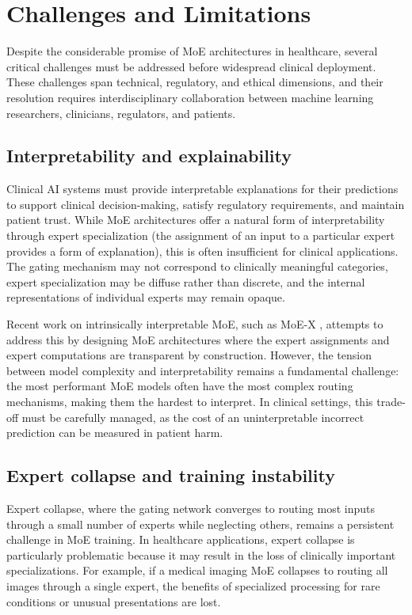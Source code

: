 
\section*{Challenges and Limitations}

Despite the considerable promise of MoE architectures in healthcare, several critical challenges must be addressed before widespread clinical deployment. These challenges span technical, regulatory, and ethical dimensions, and their resolution requires interdisciplinary collaboration between machine learning researchers, clinicians, regulators, and patients.

\subsection*{Interpretability and explainability}

Clinical AI systems must provide interpretable explanations for their predictions to support clinical decision-making, satisfy regulatory requirements, and maintain patient trust. While MoE architectures offer a natural form of interpretability through expert specialization (the assignment of an input to a particular expert provides a form of explanation), this is often insufficient for clinical applications. The gating mechanism may not correspond to clinically meaningful categories, expert specialization may be diffuse rather than discrete, and the internal representations of individual experts may remain opaque.

Recent work on intrinsically interpretable MoE, such as MoE-X \cite{chen2024moe_llm}, attempts to address this by designing MoE architectures where the expert assignments and expert computations are transparent by construction. However, the tension between model complexity and interpretability remains a fundamental challenge: the most performant MoE models often have the most complex routing mechanisms, making them the hardest to interpret. In clinical settings, this trade-off must be carefully managed, as the cost of an uninterpretable incorrect prediction can be measured in patient harm.

\subsection*{Expert collapse and training instability}

Expert collapse, where the gating network converges to routing most inputs through a small number of experts while neglecting others, remains a persistent challenge in MoE training. In healthcare applications, expert collapse is particularly problematic because it may result in the loss of clinically important specializations. For example, if a medical imaging MoE collapses to routing all images through a single expert, the benefits of specialized processing for rare conditions or unusual presentations are lost.

